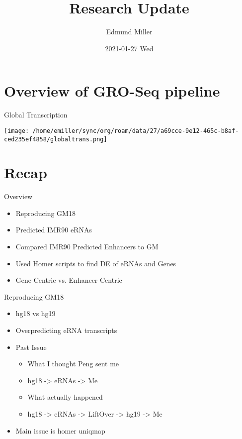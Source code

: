 \documentclass[bigger]{beamer}
\author{Edmund Miller}
\date{2021-01-27 Wed}
\title{Research Update}
\begin{document}
\maketitle

\section{Overview of GRO-Seq pipeline}
\label{sec:orgaafcaf7}

\begin{frame}[label={sec:org8960a97}]{Global Transcription}
\begin{center}
\texttt{[image: /home/emiller/sync/org/roam/data/27/a69cce-9e12-465c-b8af-ced235ef4858/globaltrans.png]}
\end{center}
\end{frame}

\section{Recap}
\label{sec:org8bba0b9}

\begin{frame}[label={sec:org2de6ffe}]{Overview}
\begin{itemize}
\item Reproducing GM18
\item Predicted IMR90 eRNAs
\item Compared IMR90 Predicted Enhancers to GM
\item Used Homer scripts to find DE of eRNAs and Genes
\item Gene Centric vs. Enhancer Centric
\end{itemize}
\end{frame}

\begin{frame}[label={sec:orga98513d}]{Reproducing GM18}
\begin{itemize}
\item hg18 vs hg19
\item Overpredicting eRNA transcripts
\item Past Issue
\begin{itemize}
\item What I thought Peng sent me
\item hg18 -> eRNAs -> Me
\item What actually happened
\item hg18 -> eRNAs -> LiftOver -> hg19 -> Me
\end{itemize}
\item Main issue is homer uniqmap
\end{itemize}
\end{frame}
\end{document}
